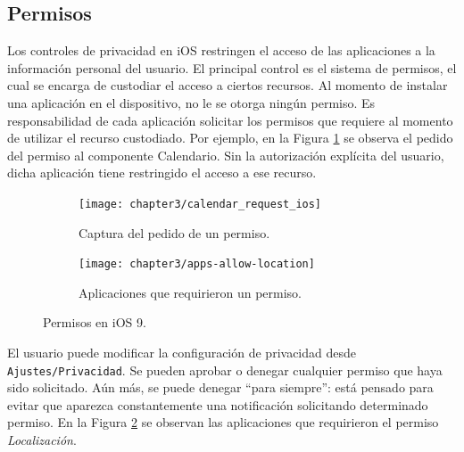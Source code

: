 \subsection{Permisos}
Los controles de privacidad en iOS restringen el acceso de las aplicaciones a la información personal del usuario. El principal control es el sistema de permisos, el cual se encarga de custodiar el acceso a ciertos recursos. Al momento de instalar una aplicación en el dispositivo, no le se otorga ningún permiso. Es responsabilidad de cada aplicación solicitar los permisos que requiere al momento de utilizar el recurso custodiado. Por ejemplo, en la Figura \ref{fig:chapter03:iospermCapture} se observa el pedido del permiso al componente Calendario. Sin la autorización explícita del usuario, dicha aplicación tiene restringido el acceso a ese recurso.\\

\begin{figure}[hbtp]
	\centering
	\begin{subfigure}{.33\linewidth}
    	\texttt{[image: chapter3/calendar\_request\_ios]}
	    \caption{Captura del pedido de un permiso.}    		
	    \label{fig:chapter03:iospermCapture}
    \end{subfigure}
    \begin{subfigure}{.33\linewidth}
    	\texttt{[image: chapter3/apps-allow-location]}
	    \caption{Aplicaciones que requirieron un permiso.}    		
	    \label{fig:chapter03:privacy}
	\end{subfigure}
	\caption{Permisos en iOS 9.}    		
	\label{fig:chapter03:app-permissions-ios}
\end{figure}
\newpage
El usuario puede modificar la configuración de privacidad desde \texttt{Ajustes/Privacidad}. Se pueden aprobar o denegar cualquier permiso que haya sido solicitado. Aún más, se puede denegar ``para siempre'': está pensado para evitar que aparezca constantemente una notificación solicitando determinado permiso. En la Figura \ref{fig:chapter03:privacy} se observan las aplicaciones que requirieron el permiso \emph{Localización}.\\

